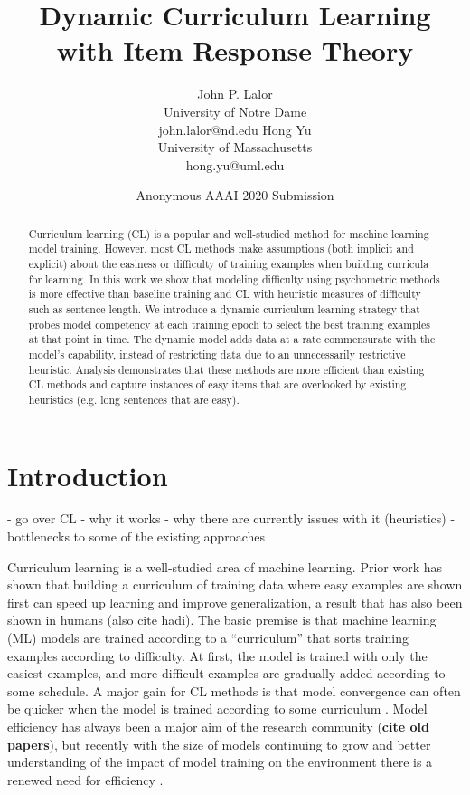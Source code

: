 \documentclass[letterpaper]{article} %
\title{Dynamic Curriculum Learning with Item Response Theory}
\author{
	John P. Lalor \\
	University of Notre Dame \\
	john.lalor@nd.edu
	\And 
	Hong Yu \\
	University of Massachusetts \\
	hong.yu@uml.edu
}
\author{
	Anonymous AAAI 2020 Submission
}
\begin{document}
\maketitle 
\begin{abstract}
	Curriculum learning (CL) is a popular and well-studied method for machine learning model training.
	However, most CL methods make assumptions (both implicit and explicit) about the easiness or difficulty of training examples when building curricula for learning.
	In this work we show that modeling difficulty using psychometric methods is more effective than baseline training and CL with heuristic measures of difficulty such as sentence length.
	We introduce a dynamic curriculum learning strategy that probes model competency at each training epoch to select the best training examples at that point in time.
	The dynamic model adds data at a rate commensurate with the model's capability, instead of restricting data due to an unnecessarily restrictive heuristic.
	Analysis demonstrates that these methods are more efficient than existing CL methods and capture instances of easy items that are overlooked by existing heuristics (e.g. long sentences that are easy).
\end{abstract}

\section{Introduction}
- go over CL
- why it works
- why there are currently issues with it (heuristics)
- bottlenecks to some of the existing approaches

Curriculum learning is a well-studied area of machine learning.
Prior work has shown that building a curriculum of training data where easy examples are shown first can speed up learning and improve generalization, a result that has also been shown in humans \cite{bengio_curriculum_2009,platanios_competence-based_2019} (also cite hadi). 
The basic premise is that machine learning (ML) models are trained according to a ``curriculum'' that sorts training examples according to difficulty.
At first, the model is trained with only the easiest examples, and more difficult examples are gradually added according to some schedule.
A major gain for CL methods is that model convergence can often be quicker when the model is trained according to some curriculum \cite{bengio_curriculum_2009,platanios_competence-based_2019}.
Model efficiency has always been a major aim of the research community (\textbf{cite old papers}), but recently with the size of models continuing to grow and better understanding of the impact of model training on the environment there is a renewed need for efficiency \cite{strubell_energy_2019}.
\end{document}

